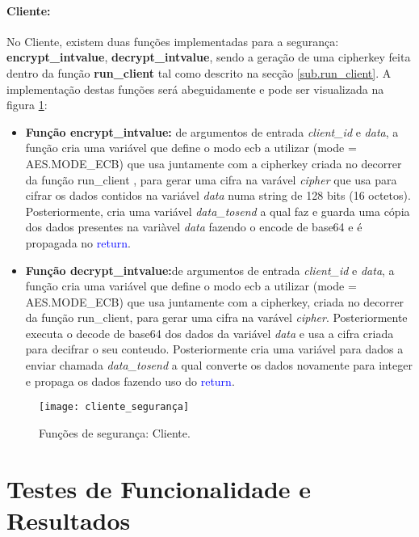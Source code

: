 \subsubsection{Cliente:}
No Cliente, existem duas funções implementadas para a segurança: \textbf{encrypt\_intvalue}, \textbf{decrypt\_intvalue}, sendo a geração de uma cipherkey feita dentro da função \textbf{run\_client} tal como descrito na secção \ref{sub.run_client}. A implementação destas funções será abeguidamente e pode ser visualizada na figura \ref{fig:cliente_segurança}:
	\begin{itemize}
		\item\textbf{Função \textbf{encrypt\_intvalue}:} de argumentos de entrada \textit{client\_id} e \textit{data}, a função cria uma variável que define o modo \ac{ecb} a utilizar (mode = AES.MODE\_ECB) que usa juntamente com a cipherkey criada no decorrer da função run\_client , para gerar uma cifra na varável \textit{cipher} que usa para cifrar os  dados contidos na variável \textit{data} numa string de 128 bits (16 octetos). Posteriormente, cria uma variável \textit{data\_tosend} a qual faz e guarda uma cópia dos dados presentes na variàvel \textit{data} fazendo o encode de base64 e é propagada no \textcolor{blue}{return}.		
		\item\textbf{Função \textbf{decrypt\_intvalue}:}de argumentos de entrada \textit{client\_id} e \textit{data}, a função cria uma variável que define o modo \ac{ecb} a utilizar (mode = AES.MODE\_ECB) que usa juntamente com a cipherkey, criada no decorrer da função run\_client, para gerar uma cifra na varável \textit{cipher}. Posteriormente  executa o decode de base64 dos dados da variável \textit{data} e usa a cifra criada para decifrar o seu conteudo. Posteriormente cria uma variável para dados a enviar chamada \textit{data\_tosend} a qual converte os dados novamente para integer e propaga os dados fazendo uso do \textcolor{blue}{return}.		
	\end{itemize} 

\begin{figure}[H]
	\centering
	\texttt{[image: cliente\_segurança]}
	\caption{Funções de segurança: Cliente.\\}
	\label{fig:cliente_segurança}
\end{figure} 


%
%
\chapter{Testes de Funcionalidade e Resultados}
\label{chap.testes e resultados}

